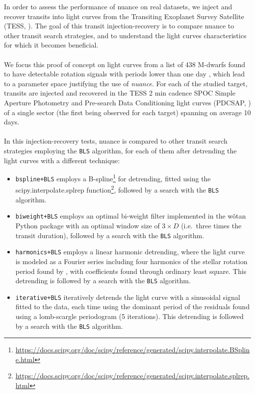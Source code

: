 \documentclass{aastex631}
\newcommand{\nuancemethod}{\textit{nuance}}
\newcommand{\nuance}{\nuancemethod{}}
\newcommand{\footlink}[1]{\footnote{\url{#1}}}
\begin{document}
In order to assess the performance of \textsf{nuance} on real datasets, we inject and recover transits into light curves from the Transiting Exoplanet Survey Satellite (TESS, \citealt{tess}). The goal of this transit injection-recovery is to compare \textsf{nuance} to other transit search strategies, and to understand the light curves characteristics for which it becomes beneficial.\\\\
We focus this proof of concept on light curves from a list of 438 M-dwarfs found to have detectable rotation signals with periods lower than one day \citep{Ramsay2020}, which lead to a parameter space justifying the use of \nuance{}. For each of the studied target, transits are injected and recovered in the TESS 2 min cadence SPOC Simple Aperture Photometry and Pre-search Data Conditioning light curves (PDCSAP, \citealt{spoc}) of a single sector (the first being observed for each target) spanning on average 10 days.\\\\
In this injection-recovery tests, \textsf{nuance} is compared to other transit search strategies employing the \texttt{BLS} algorithm, for each of them after detrending the light curves with a different technique:
\begin{itemize}
    \item \texttt{bspline+BLS} employs a B-spline\footlink{https://docs.scipy.org/doc/scipy/reference/generated/scipy.interpolate.BSpline.html} for detrending, fitted using the \textsf{scipy.interpolate.splrep} function\footlink{https://docs.scipy.org/doc/scipy/reference/generated/scipy.interpolate.splrep.html}, followed by a search with the \texttt{BLS} algorithm.
    \item \texttt{biweight+BLS} employs an optimal bi-weight filter implemented in the \textsf{wõtan} Python package \citep{wotan} with an optimal window size of $3\times D$ (i.e.\, three times the transit duration), followed by a search with the \texttt{BLS} algorithm.
    \item \texttt{harmonics+BLS} employs a linear harmonic detrending, where the light curve is modeled as a Fourier series including four harmonics of the stellar rotation period found by \cite{Ramsay2020}, with coefficients found through ordinary least square. This detrending is followed by a search with the \texttt{BLS} algorithm.
    \item \texttt{iterative+BLS} iteratively detrends the light curve with a sinusoidal signal fitted to the data, each time using the dominant period of the residuals found using a lomb-scargle periodogram (5 iterations). This detrending is followed by a search with the \texttt{BLS} algorithm.
\end{itemize}
\end{document}
